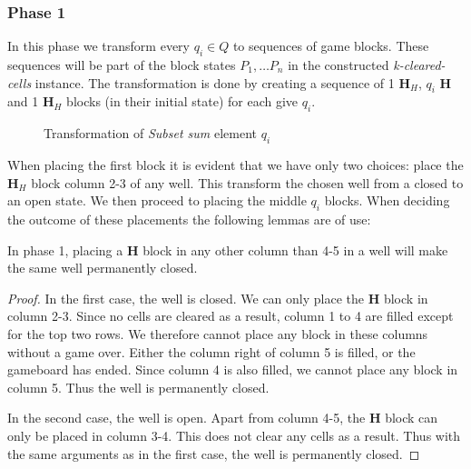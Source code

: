 \subsubsection{Phase 1}
\label{subsub:phaseone}
In this phase we transform every $q_i \in Q$ to sequences of game blocks. These sequences will be part of the block states $P_1, \ldots P_n$ in the constructed \textit{k-cleared-cells} instance. The transformation is done by creating a sequence of 1 $\mathbf{H}_{H}$, $q_i$ $\mathbf{H}$ and 1 $\mathbf{H}_H$ blocks (in their initial state) for each give $q_i$.

\begin{figure}[H]
    \centering
    \caption{Transformation of \textit{Subset sum} element $q_i$}
    \label{fig:wells}
\end{figure}

When placing the first block it is evident that we have only two choices: place the $\mathbf{H}_H$ block column 2-3 of any well. This transform the chosen well from a closed to an open state. We then proceed to placing the middle $q_i$ blocks. When deciding the outcome of these placements the following lemmas are of use:\\


\begin{lem}
\label{lem:permclose}
In phase 1, placing a $\mathbf{H}$ block in any other column than 4-5 in a well will make the same well permanently closed.
\end{lem}

\begin{proof}
In the first case, the well is closed. We can only place the $\mathbf{H}$ block in column 2-3. Since no cells are cleared as a result, column 1 to 4 are filled except for the top two rows. We therefore cannot place any block in these columns without a game over. Either the column right of column 5 is filled, or the gameboard has ended. Since column 4 is also filled, we cannot place any block in column 5. Thus the well is permanently closed.

In the second case, the well is open. Apart from column 4-5, the $\mathbf{H}$ block can only be placed in column 3-4. This does not clear any cells as a result. Thus with the same arguments as in the first case, the well is permanently closed.
\end{proof}


